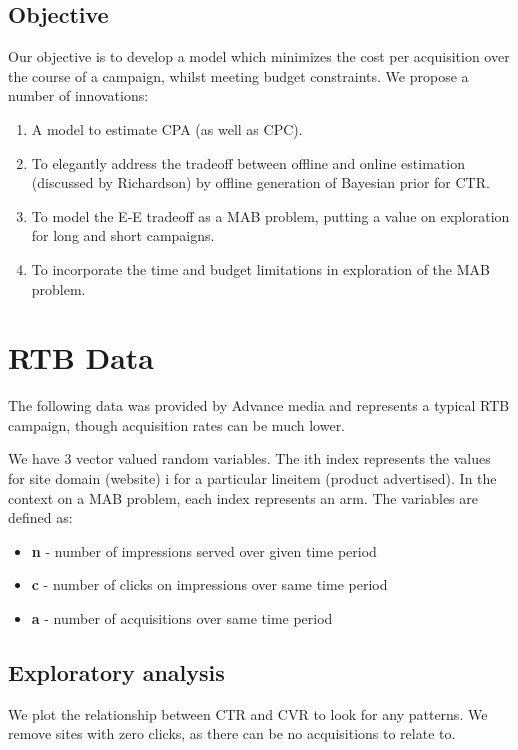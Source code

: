 \documentclass[11pt,a4,singlespacing,titlepagenumber=on]{scrreprt}
\numberwithin{equation}{chapter} %
\theoremstyle{remark}
\begin{document}
\section{Objective}
Our objective is to develop a model which minimizes the cost per acquisition over the course of a campaign, whilst meeting budget constraints. We propose a number of innovations:
\begin{enumerate}
	\item A model to estimate CPA (as well as CPC).
	\item To elegantly address the tradeoff between offline and online estimation (discussed by Richardson) by offline generation of Bayesian prior for CTR.
	\item To model the E-E tradeoff as a MAB problem, putting a value on exploration for long and short campaigns.
	\item To incorporate the time and budget limitations in exploration of the MAB problem.
\end{enumerate}


\chapter{RTB Data}

The following data was provided by Advance media and represents a typical RTB campaign, though acquisition rates can be much lower.

We have 3 vector valued random variables. The ith index represents the values for site domain (website) i for a particular lineitem (product advertised). In the context on a MAB problem, each index represents an arm. The variables are defined as:
\begin{itemize}
	\item \textbf{n} - number of impressions served over given time period
	\item \textbf{c} - number of clicks on impressions over same time period 
	\item \textbf{a} - number of acquisitions over same time period
\end{itemize}

\section{Exploratory analysis}

We plot the relationship between CTR and CVR to look for any patterns. We remove sites with zero clicks, as there can be no acquisitions to relate to. 
\end{document}
